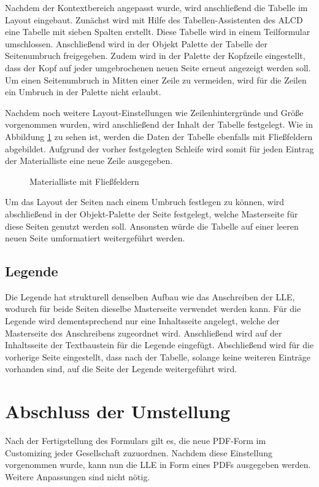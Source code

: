 Nachdem der Kontextbereich angepasst wurde, wird anschließend die Tabelle im Layout eingebaut. Zunächst wird mit Hilfe des Tabellen-Assistenten des \ac{ALCD} eine Tabelle mit sieben Spalten erstellt. Diese Tabelle wird in einem Teilformular umschlossen. Anschließend wird in der Objekt Palette der Tabelle der Seitenumbruch freigegeben. Zudem wird in der Palette der Kopfzeile eingestellt, dass der Kopf auf jeder umgebrochenen neuen Seite erneut angezeigt werden soll. Um einen Seitenumbruch in Mitten einer Zeile zu vermeiden, wird für die Zeilen ein Umbruch in der Palette nicht erlaubt. 

Nachdem noch weitere Layout-Einstellungen wie Zeilenhintergründe und Größe vorgenommen wurden, wird anschließend der Inhalt der Tabelle festgelegt. Wie in Abbildung \ref{figTab} zu sehen ist, werden die Daten der Tabelle ebenfalls mit Fließfeldern abgebildet. Aufgrund der vorher festgelegten Schleife wird somit für jeden Eintrag der Materialliste eine neue Zeile ausgegeben.

\begin{figure}[ht]
	\centering
	\caption{Materialliste mit Fließfeldern}
	\label{figTab}
	
\end{figure}

Um das Layout der Seiten nach einem Umbruch festlegen zu können, wird abschließend in der Objekt-Palette der Seite festgelegt, welche Masterseite für diese Seiten genutzt werden soll. Ansonsten würde die Tabelle auf einer leeren neuen Seite umformatiert weitergeführt werden.

\FloatBarrier
\subsection{Legende}

Die Legende hat strukturell denselben Aufbau wie das Anschreiben der \ac{LLE}, wodurch für beide Seiten dieselbe Masterseite verwendet werden kann. Für die Legende wird dementsprechend nur eine Inhaltsseite angelegt, welche der Masterseite des Anschreibens zugeordnet wird. Anschließend wird auf der Inhaltsseite der Textbaustein für die Legende eingefügt. Abschließend wird für die vorherige Seite eingestellt, dass nach der Tabelle, solange keine weiteren Einträge vorhanden sind, auf die Seite der Legende weitergeführt wird.


\section{Abschluss der Umstellung}

Nach der Fertigstellung des Formulars gilt es, die neue PDF-Form im Customizing jeder Gesellschaft zuzuordnen. Nachdem diese Einstellung vorgenommen wurde, kann nun die \ac{LLE} in Form eines \ac{PDF}s ausgegeben werden. Weitere Anpassungen sind nicht nötig.



